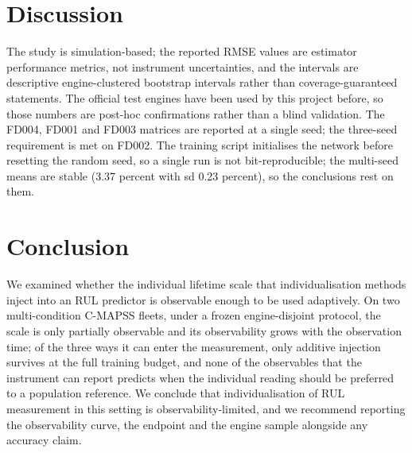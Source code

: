 \documentclass[journal]{IEEEtran}
\begin{document}
\section{Discussion}\label{sec:disc}
The study is simulation-based; the reported RMSE values are estimator performance metrics, not instrument uncertainties, and the intervals are descriptive engine-clustered bootstrap intervals rather than coverage-guaranteed statements. The official test engines have been used by this project before, so those numbers are post-hoc confirmations rather than a blind validation. The FD004, FD001 and FD003 matrices are reported at a single seed; the three-seed requirement is met on FD002. The training script initialises the network before resetting the random seed, so a single run is not bit-reproducible; the multi-seed means are stable (3.37 percent with sd 0.23 percent), so the conclusions rest on them.

\section{Conclusion}\label{sec:concl}
We examined whether the individual lifetime scale that individualisation methods inject into an RUL predictor is observable enough to be used adaptively. On two multi-condition C-MAPSS fleets, under a frozen engine-disjoint protocol, the scale is only partially observable and its observability grows with the observation time; of the three ways it can enter the measurement, only additive injection survives at the full training budget, and none of the observables that the instrument can report predicts when the individual reading should be preferred to a population reference. We conclude that individualisation of RUL measurement in this setting is observability-limited, and we recommend reporting the observability curve, the endpoint and the engine sample alongside any accuracy claim.
\end{document}
